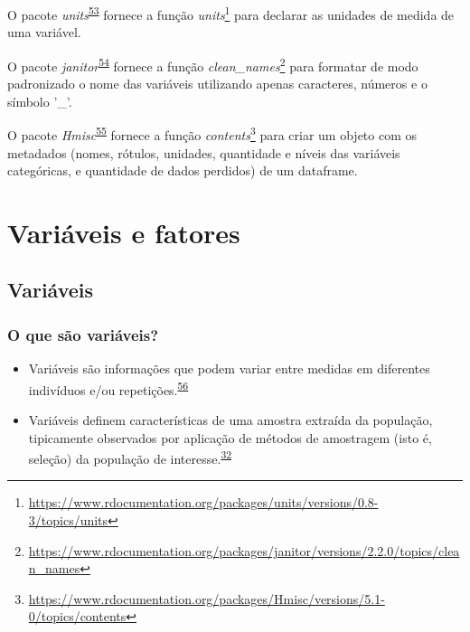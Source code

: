 \documentclass[
  a4paper,
]{book}
\renewcommand{\href}[2]{#2\footnote{\url{#1}}}
\newenvironment{infobox}[1]
  {
  \begin{itemize}
  \renewcommand{\labelitemi}{
    \raisebox{-.7\height}[0pt][0pt]{
      {\setkeys{Gin}{width=3em,keepaspectratio}
        \texttt{[image: \#1]}}
    }
  }
  \setlength{\fboxsep}{1em}
  \begin{blackbox}
  \item
  }
  {
  \end{blackbox}
  \end{itemize}
  }
\begin{document}
\begin{infobox}{images/Rlogo}
O pacote \emph{units}\textsuperscript{\protect\hyperlink{ref-units}{53}} fornece a função \href{https://www.rdocumentation.org/packages/units/versions/0.8-3/topics/units}{\emph{units}} para declarar as unidades de medida de uma variável.

\end{infobox}

\begin{infobox}{images/Rlogo}
O pacote \emph{janitor}\textsuperscript{\protect\hyperlink{ref-janitor}{54}} fornece a função \href{https://www.rdocumentation.org/packages/janitor/versions/2.2.0/topics/clean_names}{\emph{clean\_names}} para formatar de modo padronizado o nome das variáveis utilizando apenas caracteres, números e o símbolo '\_'.

\end{infobox}

\begin{infobox}{images/Rlogo}
O pacote \emph{Hmisc}\textsuperscript{\protect\hyperlink{ref-Hmisc}{55}} fornece a função \href{https://www.rdocumentation.org/packages/Hmisc/versions/5.1-0/topics/contents}{\emph{contents}} para criar um objeto com os metadados (nomes, rótulos, unidades, quantidade e níveis das variáveis categóricas, e quantidade de dados perdidos) de um dataframe.

\end{infobox}

\hypertarget{variaveis-fatores}{%
\chapter{\texorpdfstring{\textbf{Variáveis e fatores}}{Variáveis e fatores}}\label{variaveis-fatores}}

\hypertarget{variaveis}{%
\section{Variáveis}\label{variaveis}}

\hypertarget{o-que-suxe3o-variuxe1veis}{%
\subsection{O que são variáveis?}\label{o-que-suxe3o-variuxe1veis}}

\begin{itemize}
\item
  Variáveis são informações que podem variar entre medidas em diferentes indivíduos e/ou repetições.\textsuperscript{\protect\hyperlink{ref-Altman1999}{56}}
\item
  Variáveis definem características de uma amostra extraída da população, tipicamente observados por aplicação de métodos de amostragem (isto é, seleção) da população de interesse.\textsuperscript{\protect\hyperlink{ref-vetter2017}{32}}
\end{itemize}
\end{document}

